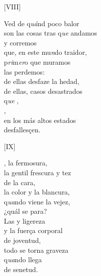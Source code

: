 \documentclass[11pt,a4paper,twoside]{article}
\begin{document}
{\begin{center}
	[VIII]
\end{center}
\pstart
Ved de q\textit{uá}nd poco balor\\
son las cosas tras q\textit{ue} andamos\\
y corremos\\
que, en este mu\textit{n}do traidor,\\
 p\textit{ri}m\textit{er}o que muramos\\
las perdemos:\\
de ellas desfaze la hedad,\\
de ellas, casos desastrados\\
q\textit{ue} ,\\
,\\
en los más altos estados\\
desfallesçen.
\pend

\begin{center}
	[IX]
\end{center}
\pstart
{}, la fermosura,\\
la gentil frescura y tez\\
de la cara,\\
la color y la blancura,\\
q\textit{ua}ndo viene la vejez,\\
¿quál se para?\\
Las  y ligereza\\
y la fuerça corporal\\
de joventud,\\
todo se torna graveza\\
q\textit{ua}ndo llega \\
de senetud.
\pend

}
\end{document}
